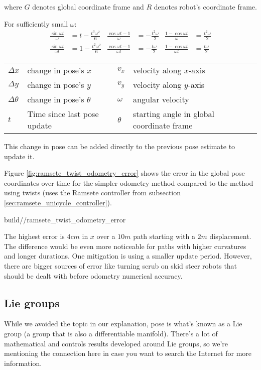 \begin{theorem}
  where $G$ denotes global coordinate frame and $R$ denotes robot's coordinate
  frame.

  For sufficiently small $\omega$:
  \begin{align}
    \frac{\sin\omega t}{\omega} &= t - \frac{t^3 \omega^2}{6} &
    \frac{\cos\omega t - 1}{\omega} &= -\frac{t^2 \omega}{2} &
    \frac{1 - \cos\omega t}{\omega} &= \frac{t^2 \omega}{2} \\
    \frac{\sin\omega t}{\omega t} &= 1 - \frac{t^2 \omega^2}{6} &
    \frac{\cos\omega t - 1}{\omega t} &= -\frac{t \omega}{2} &
    \frac{1 - \cos\omega t}{\omega t} &= \frac{t \omega}{2}
  \end{align}
  \begin{figurekey}
    \begin{tabular}{llll}
      $\Delta x$ & change in pose's $x$ & $v_x$ & velocity along $x$-axis \\
      $\Delta y$ & change in pose's $y$ & $v_y$ & velocity along $y$-axis \\
      $\Delta \theta$ & change in pose's $\theta$ & $\omega$ & angular velocity
        \\
      $t$ & Time since last pose update & $\theta$ & starting angle in global
        coordinate frame
    \end{tabular}
  \end{figurekey}

  This change in pose can be added directly to the previous pose estimate to
  update it.
\end{theorem}

Figure \ref{fig:ramsete_twist_odometry_error} shows the error in the global pose
coordinates over time for the simpler odometry method compared to the method
using twists (uses the Ramsete controller from subsection
\ref{sec:ramsete_unicycle_controller}).
\begin{svg}{build/\chapterpath/ramsete_twist_odometry_error}
  \caption{Odometry error compared to method using twists ($dt = 0.05s$)}
  \label{fig:ramsete_twist_odometry_error}
\end{svg}

The highest error is $4cm$ in $x$ over a $10m$ path starting with a $2m$
displacement. The difference would be even more noticeable for paths with higher
curvatures and longer durations. One mitigation is using a smaller update
period. However, there are bigger sources of error like turning scrub on skid
steer robots that should be dealt with before odometry numerical accuracy.

\subsection{Lie groups}

While we avoided the topic in our explanation, pose is what's known as a Lie
group (a group that is also a differentiable manifold). There's a lot of
mathematical and controls results  developed around Lie groups, so we're
mentioning the connection here in case you want to search the Internet for more
information.
